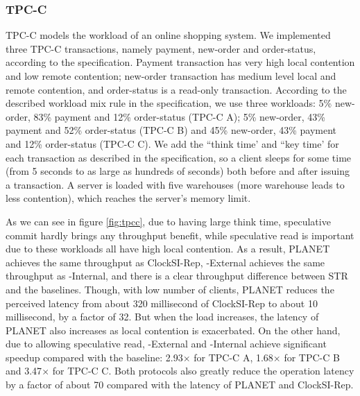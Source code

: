\subsubsection{TPC-C}
TPC-C \cite{tpcc} models the workload of an online shopping system. We implemented three TPC-C transactions, namely payment, new-order and order-status, according to the specification. Payment transaction has very high local contention and low remote contention; new-order transaction has medium level local and remote contention, and order-status is a read-only transaction. According to the described workload mix rule in the specification, we use three workloads: 5\% new-order, 83\% payment and 12\% order-status (TPC-C A); 5\% new-order, 43\% payment and 52\% order-status (TPC-C B) and 45\% new-order, 43\% payment and 12\% order-status (TPC-C C). We add the ``think time' and ``key time' for each transaction as described in the specification, so a client sleeps for some time (from 5 seconds to as large as hundreds of seconds) both before and after issuing a transaction. A server is loaded with five warehouses (more warehouse leads to less contention), which reaches the server's memory limit.

As we can see in figure \ref{fig:tpcc}, due to having large think time, speculative commit hardly brings any throughput benefit, while speculative read is important due to these workloads all have high local contention. As a result, PLANET achieves the same throughput as ClockSI-Rep, {\specula}-External achieves the same throughput as {\specula}-Internal, and there is a clear throughput difference between STR and the baselines. Though, with low number of clients, PLANET reduces the perceived latency from about 320 millisecond of ClockSI-Rep to about 10 millisecond, by a factor of 32. But when the load increases, the latency of PLANET also increases as local contention is exacerbated. On the other hand, due to allowing speculative read, {\specula}-External and {\specula-Internal} achieve significant speedup compared with the baseline: 2.93$\times$ for TPC-C A, 1.68$\times$ for TPC-C B and 3.47$\times$ for TPC-C C. Both {\specula} protocols also greatly reduce the operation latency by a factor of about 70 compared with the latency of PLANET and ClockSI-Rep.

